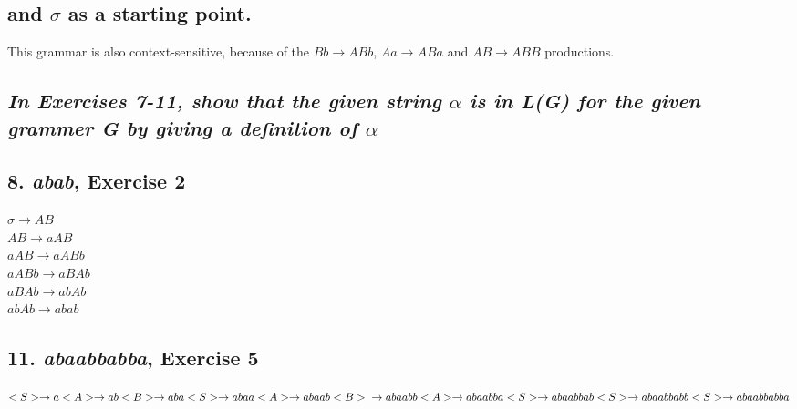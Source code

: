 \documentclass[12pt,titlepage]{article}
\begin{document}
\subsection*{and $\sigma$ as a starting point.}
This grammar is also context-sensitive, because of the $Bb \rightarrow ABb$,
$Aa \rightarrow ABa$ and $AB \rightarrow ABB$ productions.
\subsection*{\textit{In Exercises 7-11, show that the given string $\alpha$ is in
L(G) for the given grammer G by giving a definition of $\alpha$}}
\subsection*{8. \textit{abab}, Exercise 2}
$\sigma \rightarrow AB$\\
$AB \rightarrow aAB$\\
$aAB \rightarrow aABb$\\
$aABb \rightarrow aBAb$\\
$aBAb \rightarrow abAb$\\
$abAb \rightarrow abab$\\
\subsection*{11. \textit{abaabbabba}, Exercise 5}
$<S> \rightarrow a<A> \rightarrow ab<B> \rightarrow aba<S> \rightarrow
abaa<A> \rightarrow abaab<B>\\ \rightarrow abaabb<A> \rightarrow abaabba<S>
\rightarrow abaabbab<S> \rightarrow abaabbabb<S> \rightarrow abaabbabba$
\end{document}
